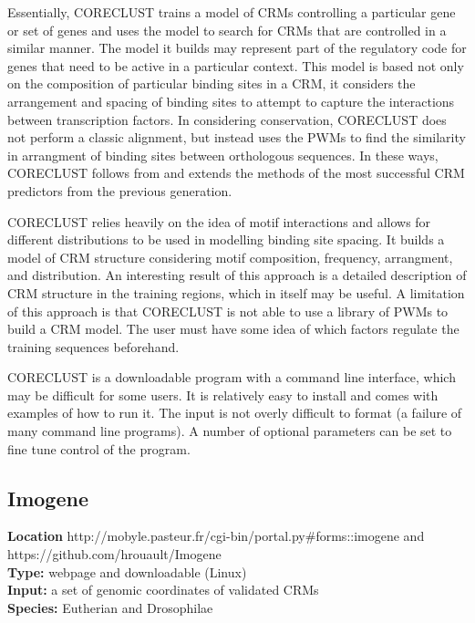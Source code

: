 \documentclass{frontiersENG} %
\begin{document}
Essentially, CORECLUST trains a model of CRMs controlling a particular
gene or set of genes and uses the model to search for CRMs that are
controlled in a similar manner. The model it builds may represent part
of the regulatory code for genes that need to be active in a
particular context. This model is based not only on the composition of
particular binding sites in a CRM, it considers the arrangement and
spacing of binding sites to attempt to capture the interactions
between transcription factors. In considering conservation, CORECLUST
does not perform a classic alignment, but instead uses the PWMs to
find the similarity in arrangment of binding sites between orthologous
sequences. In these ways, CORECLUST follows from and extends the
methods of the most successful CRM predictors from the previous
generation.

CORECLUST relies heavily on the idea of motif interactions and allows
for different distributions to be used in modelling binding site
spacing. It builds a model of CRM structure considering motif
composition, frequency, arrangment, and distribution. An interesting
result of this approach is a detailed description of CRM structure in
the training regions, which in itself may be useful. A limitation of
this approach is that CORECLUST is not able to use a library of PWMs
to build a CRM model. The user must have some idea of which factors
regulate the training sequences beforehand.

CORECLUST is a downloadable program with a command line interface,
which may be difficult for some users. It is relatively easy to
install and comes with examples of how to run it. The input is not
overly difficult to format (a failure of many command line
programs). A number of optional parameters can be set to fine tune
control of the program.


\subsection{Imogene}
\noindent
\textbf{Location} http://mobyle.pasteur.fr/cgi-bin/portal.py\#forms::imogene and https://github.com/hrouault/Imogene \\
\textbf{Type:} webpage and downloadable (Linux) \\
\textbf{Input:} a set of genomic coordinates of validated CRMs \\
\textbf{Species:} Eutherian and Drosophilae \\
\end{document}
